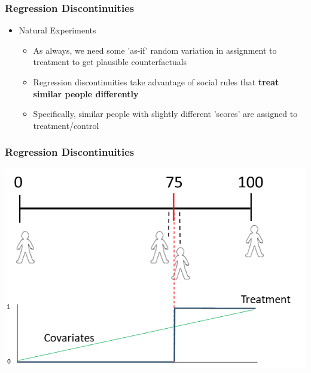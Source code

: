 \documentclass[xcolor=x11names,compress]{beamer}\usepackage[]{graphicx}\usepackage[]{color}
\renewcommand{\(}{\begin{columns}}
\renewcommand{\)}{\end{columns}}
\newcommand{\<}[1]{\begin{column}{#1}}
\renewcommand{\>}{\end{column}}
\begin{document}
\begin{frame}
\frametitle{Regression Discontinuities}
\begin{itemize}
\item Natural Experiments
\begin{itemize}
\item As always, we need some 'as-if' random variation in assignment to treatment to get plausible counterfactuals
\pause
\item Regression discontinuities take advantage of social rules that \textbf{treat similar people differently}
\pause
\item Specifically, similar people with slightly different 'scores' are assigned to treatment/control
\end{itemize}
\end{itemize}
\end{frame}

\begin{frame}
\frametitle{Regression Discontinuities}
\begin{center}
\includegraphics[scale=0.45]{Scale.png}
\end{center}
\end{frame}
\end{document}
